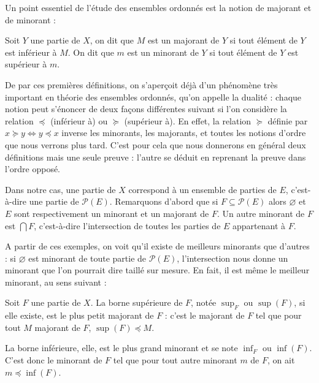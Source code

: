 Un point essentiel de l'étude des ensembles ordonnés est la notion de majorant et de minorant :

\begin{defi}
    Soit $Y$ une partie de $X$, on dit que $M$ est un majorant de $Y$ si tout élément de $Y$ est inférieur à $M$. On dit que $m$ est un minorant de $Y$ si tout élément de $Y$ est supérieur à $m$.
\end{defi}

\begin{rmk}
    De par ces premières définitions, on s'aperçoit déjà d'un phénomène très important en théorie des ensembles ordonnés, qu'on appelle la dualité : chaque notion peut s'énoncer de deux façons différentes suivant si l'on considère la relation $\preceq$ (\og inférieur à\fg{}) ou $\succeq$ (\og supérieur à\fg{}). En effet, la relation $\succeq$ définie par $x\succeq y \iff y\preceq x$ inverse les minorants, les majorants, et toutes les notions d'ordre que nous verrons plus tard. C'est pour cela que nous donnerons en général deux définitions mais une seule preuve : l'autre se déduit en reprenant la preuve dans l'ordre opposé.
\end{rmk}

\begin{expl}
    Dans notre cas, une \og partie de $X$\fg{} correspond à un ensemble de parties de $E$, c'est-à-dire une partie de $\mathcal P(E)$. Remarquons d'abord que si $F\subseteq \mathcal P(E)$ alors $\varnothing$ et $E$ sont respectivement un minorant et un majorant de $F$. Un autre minorant de $F$ est $\bigcap F$, c'est-à-dire l'intersection de toutes les parties de $E$ appartenant à $F$.
\end{expl}

A partir de ces exemples, on voit qu'il existe de meilleurs minorants que d'autres : si $\varnothing$ est minorant de toute partie de $\mathcal P(E)$, l'intersection nous donne un minorant que l'on pourrait dire \og taillé sur mesure\fg{}. En fait, il est même le meilleur minorant, au sens suivant :

\begin{defi}
    Soit $F$ une partie de $X$. La borne supérieure de $F$, notée $\sup_F$ ou $\sup(F)$, si elle existe, est le plus petit majorant de $F$ : c'est le majorant de $F$ tel que pour tout $M$ majorant de $F$, $\sup(F)\preceq M$.

    La borne inférieure, elle, est le plus grand minorant et se note $\inf_F$ ou $\inf(F)$. C'est donc le minorant de $F$ tel que pour tout autre minorant $m$ de $F$, on ait $m\preceq \inf(F)$.
\end{defi}

